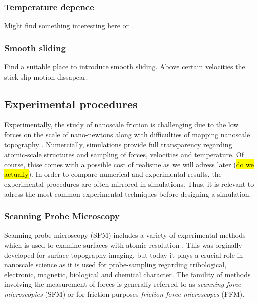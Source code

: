 
\subsubsection{Temperature depence}

Might find something interesting here \cite{zhao_thermally_2007} or \cite{PhysRevE.71.065101}.


\subsubsection{Smooth sliding}

Find a suitable place to introduce smooth sliding. Above certain velocities the stick-slip motion dissapear. \cite[p. 142-ish]{gnecco_meyer_2015}

\subsection{Experimental procedures}

Experimentally, the study of nanoscale friction is challenging due to the low forces on the scale of nano-newtons along with difficulties of mapping nanoscale topography \cite[p. ?]{gnecco_meyer_2015}. Numercially, simulations provide full transparency regarding atomic-scale structures and sampling of forces, velocities and temperature. Of course, thise comes with a possible cost of realisme as we will adress later (\hl{do we actually}). In order to compare numerical and experimental results, the experimental procedures are often mirrored in simulations. Thus, it is relevant to adress the most common experimental techniques before designing a simulation. 


\subsubsection{Scanning Probe Microscopy}\label{sec:SPM}
Scanning probe microscopy (SPM) includes a variety of experimental methods which
is used to examine surfaces with atomic resolution \cite[p.
6-?]{BHUSHAN20051507}. This was orginally developed for surface topography
imaging, but today it plays a crucial role in nanoscale science as it is used
for probe-sampling regarding tribological, electronic, magnetic, biological and
chemical character. The famility of methods involving the measurement of forces
is generally referred to as \textit{scanning force microscopies} (SFM) or for friction purposes \textit{friction force microscopes} (FFM).

